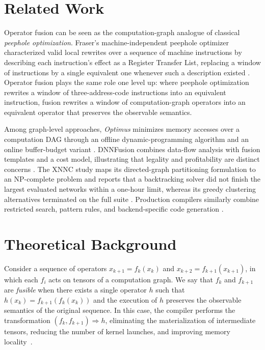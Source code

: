 \documentclass[sigconf]{acmart}
\begin{document}
\section{Related Work}
\label{sec:related}

Operator fusion can be seen as the computation-graph analogue of classical \emph{peephole optimization}. Fraser's machine-independent peephole optimizer characterized valid local rewrites over a sequence of machine instructions by describing each instruction's effect as a Register Transfer List, replacing a window of instructions by a single equivalent one whenever such a description existed \cite{fraser1979peephole}. Operator fusion plays the same role one level up: where peephole optimization rewrites a window of three-address-code instructions into an equivalent instruction, fusion rewrites a window of computation-graph operators into an equivalent operator that preserves the observable semantics.

Among graph-level approaches, \emph{Optimus} minimizes memory accesses over a computation DAG through an offline dynamic-programming algorithm and an online buffer-budget variant \cite{cai2022optimus}. DNNFusion combines data-flow analysis with fusion templates and a cost model, illustrating that legality and profitability are distinct concerns \cite{liu2021dnnfusion}. The XNNC study maps its directed-graph partitioning formulation to an NP-complete problem and reports that a backtracking solver did not finish the largest evaluated networks within a one-hour limit, whereas its greedy clustering alternatives terminated on the full suite \cite{canesche2025xnnc}. Production compilers similarly combine restricted search, pattern rules, and backend-specific code generation \cite{pytorch2022,chen2018tvm}.

\section{Theoretical Background}
\label{sec:background}

Consider a sequence of operators $x_{k+1}=f_k(x_k)$ and $x_{k+2}=f_{k+1}(x_{k+1})$, in which each $f_i$ acts on tensors of a computation graph. We say that $f_k$ and $f_{k+1}$ are \emph{fusible} when there exists a single operator $h$ such that $h(x_k)=f_{k+1}(f_k(x_k))$ and the execution of $h$ preserves the observable semantics of the original sequence. In this case, the compiler performs the transformation $(f_k,f_{k+1})\Rightarrow h$, eliminating the materialization of intermediate tensors, reducing the number of kernel launches, and improving memory locality~\cite{chen2018tvm,liu2021dnnfusion}.
\end{document}

